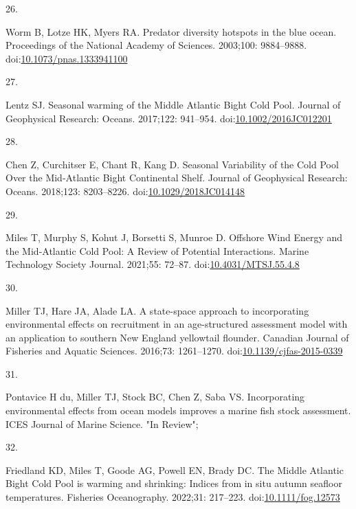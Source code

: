 \documentclass[
  10pt,
]{article}
\newlength{\cslhangindent}
\newlength{\csllabelwidth}
\newlength{\cslentryspacingunit} %
\newenvironment{CSLReferences}[2] %
 {%
  \setlength{\parindent}{0pt}
  \ifodd #1
  \let\oldpar\par
  \def\par{\hangindent=\cslhangindent\oldpar}
  \fi
  \setlength{\parskip}{#2\cslentryspacingunit}
 }%
 {}
\newcommand{\CSLLeftMargin}[1]{\parbox[t]{\csllabelwidth}{#1}}
\newcommand{\CSLRightInline}[1]{\parbox[t]{\linewidth - \csllabelwidth}{#1}\break}
\begin{document}
\begin{CSLReferences}{0}{0}
\leavevmode{}%
\CSLLeftMargin{26. }%
\CSLRightInline{Worm B, Lotze HK, Myers RA. Predator diversity hotspots in the blue ocean. Proceedings of the National Academy of Sciences. 2003;100: 9884--9888. doi:\href{https://doi.org/10.1073/pnas.1333941100}{10.1073/pnas.1333941100}}

\leavevmode{}%
\CSLLeftMargin{27. }%
\CSLRightInline{Lentz SJ. Seasonal warming of the {Middle} {Atlantic} {Bight} {Cold} {Pool}. Journal of Geophysical Research: Oceans. 2017;122: 941--954. doi:\href{https://doi.org/10.1002/2016JC012201}{10.1002/2016JC012201}}

\leavevmode{}%
\CSLLeftMargin{28. }%
\CSLRightInline{Chen Z, Curchitser E, Chant R, Kang D. Seasonal {Variability} of the {Cold} {Pool} {Over} the {Mid}-{Atlantic} {Bight} {Continental} {Shelf}. Journal of Geophysical Research: Oceans. 2018;123: 8203--8226. doi:\href{https://doi.org/10.1029/2018JC014148}{10.1029/2018JC014148}}

\leavevmode{}%
\CSLLeftMargin{29. }%
\CSLRightInline{Miles T, Murphy S, Kohut J, Borsetti S, Munroe D. Offshore {Wind} {Energy} and the {Mid}-{Atlantic} {Cold} {Pool}: {A} {Review} of {Potential} {Interactions}. Marine Technology Society Journal. 2021;55: 72--87. doi:\href{https://doi.org/10.4031/MTSJ.55.4.8}{10.4031/MTSJ.55.4.8}}

\leavevmode{}%
\CSLLeftMargin{30. }%
\CSLRightInline{Miller TJ, Hare JA, Alade LA. A state-space approach to incorporating environmental effects on recruitment in an age-structured assessment model with an application to southern {New} {England} yellowtail flounder. Canadian Journal of Fisheries and Aquatic Sciences. 2016;73: 1261--1270. doi:\href{https://doi.org/10.1139/cjfas-2015-0339}{10.1139/cjfas-2015-0339}}

\leavevmode{}%
\CSLLeftMargin{31. }%
\CSLRightInline{Pontavice H du, Miller TJ, Stock BC, Chen Z, Saba VS. Incorporating environmental effects from ocean models improves a marine fish stock assessment. ICES Journal of Marine Science. "In Review"; }

\leavevmode{}%
\CSLLeftMargin{32. }%
\CSLRightInline{Friedland KD, Miles T, Goode AG, Powell EN, Brady DC. The {Middle} {Atlantic} {Bight} {Cold} {Pool} is warming and shrinking: {Indices} from in situ autumn seafloor temperatures. Fisheries Oceanography. 2022;31: 217--223. doi:\href{https://doi.org/10.1111/fog.12573}{10.1111/fog.12573}}


\end{CSLReferences}
\end{document}
